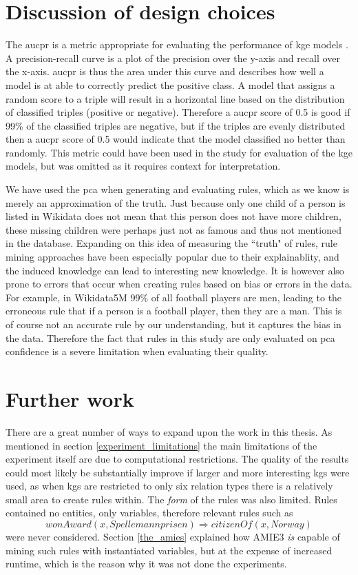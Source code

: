 \section{Discussion of design choices}
The \gls{aucpr} is a metric appropriate for evaluating the performance of \gls{kge} models \cite{jahn2021reasoning}. A precision-recall curve is a plot of the precision over the y-axis and recall over the x-axis. \gls{aucpr} is thus the area under this curve and describes how well a model is at able to correctly predict the positive class. A model that assigns a random score to a triple will result in a horizontal line based on the distribution of classified triples (positive or negative). Therefore a \gls{aucpr} score of 0.5 is good if 99\% of the classified triples are negative, but if the triples are evenly distributed then a \gls{aucpr} score of 0.5 would indicate that the model classified no better than randomly. This metric could have been used in the study for evaluation of the \gls{kge} models, but was omitted as it requires context for interpretation.

We have used the \gls{pca} when generating and evaluating rules, which as we know is merely an approximation of the truth. Just because only one child of a person is listed in Wikidata does not mean that this person does not have more children, these missing children were perhaps just not as famous and thus not mentioned in the database. Expanding on this idea of measuring the ``truth" of rules, rule mining approaches have been especially popular due to their explainablity, and the induced knowledge can lead to interesting new knowledge. It is however also prone to errors that occur when creating rules based on bias or errors in the data. For example, in Wikidata5M 99\% of all football players are men, leading to the erroneous rule that if a person is a football player, then they are a man. This is of course not an accurate rule by our understanding, but it captures the bias in the data. Therefore the fact that rules in this study are only evaluated on \gls{pca} confidence is a severe limitation when evaluating their quality.

\section{Further work}
There are a great number of ways to expand upon the work in this thesis. As mentioned in section \ref{experiment_limitations} the main limitations of the experiment itself are due to computational restrictions. The quality of the results could most likely be substantially improve if larger and more interesting \glspl{kg} were used, as when \glspl{kg} are restricted to only six relation types there is a relatively small area to create rules within. The \textit{form} of the rules was also limited. Rules contained no entities, only variables, therefore relevant rules such as
\[wonAward(x, Spellemannprisen) \Rightarrow citizenOf(x, Norway)\]
were never considered. Section \ref{the_amies} explained how AMIE3 \textit{is} capable of mining such rules with instantiated variables, but at the expense of increased runtime, which is the reason why it was not done the experiments.

